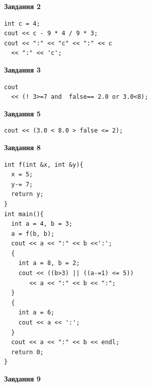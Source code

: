 \documentclass[12pt, ukrainian]{article}
\begin{document}
{\begin {large}
\begin{minipage}[t]{7.0cm}
\end{minipage}
\vline \hspace{1mm}
\begin{minipage}[t]{11.0cm}

\begin{center}
\textbf{Завдання 2}
\end{center}
\vspace{-8mm}

\begin{verbatim}
int c = 4;
cout << c - 9 * 4 / 9 * 3;
cout << ":" << "c" << ":" << c 
  << ":" << 'c';
\end{verbatim}



\begin{center}
\textbf{Завдання 3}
\end{center}
\vspace{-8mm}

\begin{verbatim}
cout 
  << (! 3>=7 and  false== 2.0 or 3.0<8);
\end{verbatim}



\begin{center}
\textbf{Завдання 5}
\end{center}
\vspace{-8mm}

\begin{verbatim}
cout << (3.0 < 8.0 > false <= 2);
\end{verbatim}



\begin{center}
\textbf{Завдання 8}
\end{center}
\vspace{-8mm}

\begin{verbatim}
int f(int &x, int &y){
  x = 5;
  y-= 7;
  return y;
}
int main(){
  int a = 4, b = 3;
  a = f(b, b);
  cout << a << ":" << b <<':';
  {
    int a = 8, b = 2;
    cout << ((b>3) || ((a-=1) <= 5))
       << a << ":" << b << ":";
  }
  {
    int a = 6;
    cout << a << ':';
  }
  cout << a << ":" << b << endl;
  return 0;
}
\end{verbatim}

\end{minipage}


\begin{minipage}[t]{7.0cm}

\begin{center}
\textbf{Завдання 9}
\end{center}
\vspace{-8mm}


\end{minipage}
\end{large}}
\end{document}
